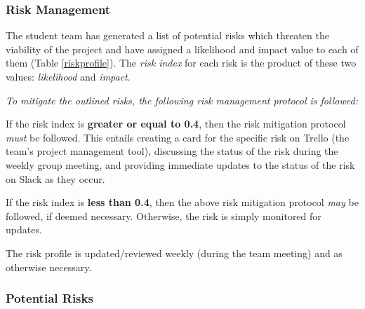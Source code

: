\subsubsection{Risk Management}
The student team has generated a list of potential risks which threaten the viability of the project and have assigned a likelihood and impact value to each of them (Table \ref{riskprofile}). The \textit{risk index} for each risk is the product of these two values: \textit{likelihood} and \textit{impact}.

\textit{To mitigate the outlined risks, the following risk management protocol is followed:}


If the risk index is \textbf{greater or equal to 0.4}, then the risk mitigation protocol \textit{must} be followed. This entails creating a card for the specific risk on Trello (the team's project management tool), discussing the status of the risk during the weekly group meeting, and providing immediate updates to the status of the risk on Slack as they occur.

If the risk index is \textbf{less than 0.4}, then the above risk mitigation protocol \textit{may} be followed, if deemed necessary. Otherwise, the risk is simply monitored for updates.

The risk profile is updated/reviewed weekly (during the team meeting) and as otherwise necessary. 


\subsubsection{Potential Risks}


